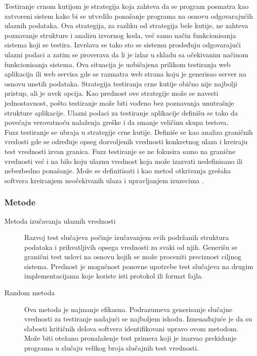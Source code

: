\documentclass[a4paper]{article}
\begin{document}
{Testiranje crnom kutijom je strategija koja
zahteva da se program posmatra kao zatvoreni sistem kako bi se utvrdilo ponašanje programa na osnovu odgovarajućih ulaznih podataka. Ova strategija, za
razliku od strategija bele kutije, ne zahteva poznavanje strukture i analizu
izvornog koda, već samo način funkcionisanja sistema koji se
testira. Izvršava se tako sto se sistemu prosleđuju odgovarajući ulazni podaci a zatim se proverava da li je izlaz u skladu sa očekivanim načinom funkcionisanja
sistema. Ova situacija je uobičajena prilikom testiranja web aplikacija ili web servisa gde se razmatra web strana koju je generisao server na osnovu unetih podataka.
Strategija testiranja crne kutije obično nije najbolji pristup, ali je uvek opcija. Kao prednost ove strategije može se navesti jednostavnost, pošto testiranje može biti vođeno bez poznavanja unutrašnje strukture aplikacije.
Ulazni podaci za testiranje aplikacije definišu se tako da povećaju verovatnoću nalaženja
greške i da smanje veličinu skupa testova.
\\

Fuzz testiranje se ubraja u strategije crne kutije. Definiše se kao analiza graničnih vredosti gde se određuje opseg dozvoljenih vrednosti 
konkretnog ulaza i kreiraju test vrednosti izvan granica. Fuzz testiranje se ne fokusira samo na granične vrednosti već i na bilo koju ulaznu vrednost koja može izazvati nedefinisano ili nebezbedno ponašanje. Može se definitisati i kao metod otkrivanja grešaka softvera kreiranjem neočekivanih ulaza i upravljanjem izuzecima \cite{fuzzing} \cite{fuzzingBruteForce}.


\subsubsection{Metode}
\label{subsubsec:metode_fuzz_testiranja}
\begin{description}
\item[Metoda izučavanja ulaznih vrednosti] 
Razvoj test slučajeva počinje izučavanjem svih podržanih struktura podataka i prihvatljivih opsega vrednosti za svaki od njih. Generišu se granični test uslovi na osnovu kojih se može proceniti preciznost ciljnog sistema. Prednost je mogućnost ponovne upotrebe test slučajeva na drugim implementacijama koje koriste isti protokol ili format fajla.
\\

\item[Random metoda]
Ova metoda je najmanje efikasna. Podrazumeva generisanje slučajne vrednosti za testiranje nadajući se najboljem ishodu. Iznenađujuće je da su slabosti kritičnih delova softvera identifikovani upravo ovom metodom. Može biti otežano pronalaženje test primera koji je izazvao 
prekidanje programa u slučaju velikog broja slučajnih test vrednosti. 
\\


\end{description}}
\end{document}

